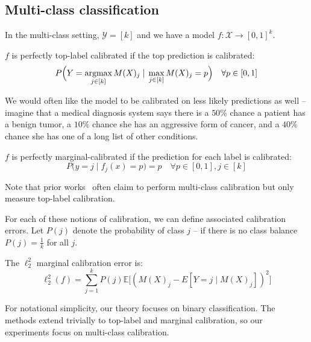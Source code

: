\subsection{Multi-class classification}

In the multi-class setting, $\mathcal{Y} = [k]$ and we have a model $f : \mathcal{X} \to [0, 1]^k$.

\begin{definition}
$f$ is perfectly top-label calibrated if the top prediction is calibrated:
\[ P\Big(Y = \mathop{\mbox{argmax}}_{j \in [k]} M(X)_j \; | \; \max_{j \in [k]} M(X)_j = p\Big) \quad \forall p \in [0, 1] \]
\end{definition}

We would often like the model to be calibrated on less likely predictions as well -- imagine that a medical diagnosis system says there is a $50\%$ chance a patient has a benign tumor, a $10\%$ chance she has an aggressive form of cancer, and a $40\%$ chance she has one of a long list of other conditions.

\begin{definition}
$f$ is perfectly marginal-calibrated if the prediction for each label is calibrated:
\[ P\Big(y = j \; | \; f_j(x) = p\Big) = p \quad \forall p \in [0, 1], j \in [k] \]
\end{definition}

Note that prior works~\cite{guo2017calibration, hendrycks2019anomaly, hendrycks2019pretraining} often claim to perform multi-class calibration but only measure top-label calibration.

For each of these notions of calibration, we can define associated calibration errors.
Let $P(j)$ denote the probability of class $j$ -- if there is no class balance $P(j) = \frac{1}{k}$ for all $j$.

\begin{definition}
\label{dfn:marginal-ce}
The $\ell_2^2$ marginal calibration error is:
\[ \ell_2^2(f) = \sum_{j = 1}^k P(j) \mathbb{E}\big[ (M(X)_j - E[Y = j \; | \; M(X)_j])^2 \big] \]
\end{definition}

For notational simplicity, our theory focuses on binary classification.
The methods extend trivially to top-label and marginal calibration, so our experiments focus on multi-class calibration.

